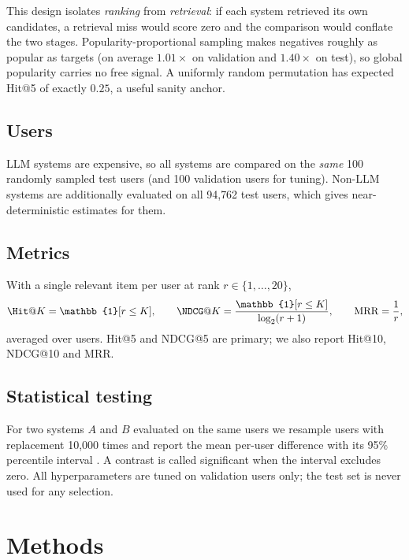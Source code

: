 \documentclass[11pt,a4paper]{article}
\newcommand{\MRR}{\mathrm{MRR}}
\begin{document}
This design isolates \emph{ranking} from \emph{retrieval}: if each system retrieved its own
candidates, a retrieval miss would score zero and the comparison would conflate the two stages.
Popularity-proportional sampling makes negatives roughly as popular as targets (on average
$1.01\times$ on validation and $1.40\times$ on test), so global popularity carries no free
signal. A uniformly random permutation has expected Hit@5 of exactly $0.25$, a useful sanity
anchor.

\subsection{Users}

LLM systems are expensive, so all systems are compared on the \emph{same} 100 randomly sampled
test users (and 100 validation users for tuning). Non-LLM systems are additionally evaluated on
all 94{,}762 test users, which gives near-deterministic estimates for them.

\subsection{Metrics}

With a single relevant item per user at rank $r\in\{1,\dots,20\}$,
\begin{equation}
  \Hit@K = \mathbb{1}[r\le K],\qquad
  \NDCG@K = \frac{\mathbb{1}[r\le K]}{\log_2(r+1)},\qquad
  \MRR = \frac{1}{r},
\end{equation}
averaged over users. Hit@5 and NDCG@5 are primary; we also report Hit@10, NDCG@10 and MRR.

\subsection{Statistical testing}

For two systems $A$ and $B$ evaluated on the same users we resample users with replacement
10{,}000 times and report the mean per-user difference with its 95\% percentile interval
\citep{efron1993bootstrap}. A contrast is called significant when the interval excludes zero.
All hyperparameters are tuned on validation users only; the test set is never used for any
selection.

\section{Methods}
\label{sec:method}
\end{document}
